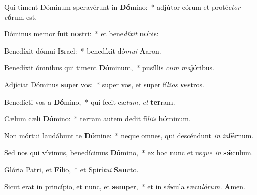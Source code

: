 \item Qui timent Dóminum speravérunt in \textbf{Dó}mino:~* adjútor eórum et proté\teenyhspace\textit{ctor} \textit{e}\textbf{ó}rum est.
\item Dóminus memor fuit \textbf{no}stri:~* et bene\teenyhspace\textit{díxit} \textbf{no}bis:
\item Benedíxit dómui \textbf{Is}rael:~* benedíxit dó\textit{mui} \textbf{A}aron.
\item  Benedíxit ómnibus qui timent \textbf{Dó}minum,~* pusíllis \textit{cum} \textit{ma}\textbf{jó}ribus.
\item Adjíciat Dóminus \textbf{su}per vos:~* super vos, et super fí\textit{lios} \textbf{ve}stros.
\item Benedícti vos a \textbf{Dó}mino,~* qui fecit cæ\teenyhspace\textit{lum,} \textit{et} \textbf{ter}ram.
\item Cælum cæli \textbf{Dó}mino:~* terram autem dedit fí\teenyhspace\textit{liis} \textbf{hó}minum.
\item Non mórtui laudábunt te \textbf{Dó}mine:~* neque omnes, qui descéndunt \textit{in} \textit{in}\textbf{fér}num.
\item Sed nos qui vívimus, benedícimus \textbf{Dó}mino,~* ex hoc nunc et us\teenyhspace\textit{que} \textit{in} \textbf{sǽ}culum.
\item Glória Patri, et \textbf{Fí}lio,~* et Spirí\tinyhspace\textit{tui} \textbf{San}cto.
\item Sicut erat in princípio, et nunc, et \textbf{sem}per,~* et in sǽcula sæcu\tinyhspace\textit{lórum.} \textbf{A}men.
